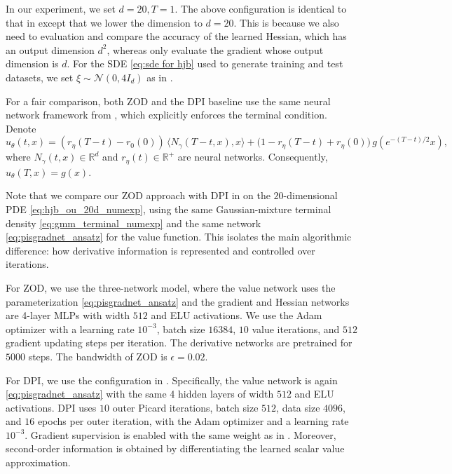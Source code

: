 \documentclass[twoside,11pt]{article}
\newcommand{\R}{\mathbb{R}}
\newcommand{\1}{\mathbf{1}}
\numberwithin{equation}{section}
\begin{document}
In our experiment, we set $
d=20,T=1$. The above configuration is identical to that in \citet{han26} except that we lower the dimension to $d=20$. This is because we  also need to evaluation and compare the accuracy of the learned Hessian, which has an output dimension $d^2$, whereas \citet{han26} only evaluate the gradient whose output dimension is $d$. For the SDE \eqref{eq:sde for hjb} used to generate training and test datasets, we set $ \xi \sim \mathcal{N}(0,4 I_d)$ as in \citet{han26}.





For a fair comparison, both ZOD and the DPI baseline use the same neural network framework from \cite{han26}, which explicitly enforces the terminal condition. Denote
\begin{equation}
    u_\theta(t,x)
    =
    (r_\eta(T - t) - r_0(0))\,\langle N_\gamma(T-t,x),x\rangle
    +
    \bigl(1-r_\eta(T-t) + r_{\eta}(0)\bigr)\,g\!\left(e^{-(T-t)/2}x\right),
    \label{eq:pisgradnet_ansatz}
\end{equation}
where $N_\gamma(t,x)\in\mathbb{R}^d$ and $r_\eta(t) \in \R^+$ are neural networks.
Consequently,
$u_\theta(T,x)=g(x)$.



Note that we compare our ZOD approach with DPI in \cite{han26} on the $20$-dimensional PDE \eqref{eq:hjb_ou_20d_numexp}, using the same Gaussian-mixture terminal density \eqref{eq:gmm_terminal_numexp} and the same network  \eqref{eq:pisgradnet_ansatz} for the value function. This isolates the main algorithmic difference: how derivative information is represented and controlled over iterations.

For ZOD, we use the three-network model,
where the value network uses the parameterization \eqref{eq:pisgradnet_ansatz} and the gradient and Hessian networks are 4-layer MLPs with width $512$ and ELU activations. We use the Adam optimizer with a learning rate $10^{-3}$, batch size $16384$, $10$ value iterations, and $512$ gradient updating steps per iteration. The derivative networks are pretrained for $5000$ steps. The bandwidth of ZOD is $\epsilon=0.02$.

For DPI, we use the configuration in \cite{han26}. Specifically, the value network is again \eqref{eq:pisgradnet_ansatz} with the same 4 hidden layers of width $512$ and ELU activations. DPI uses $10$ outer Picard iterations, batch size $512$, data size $4096$, and $16$ epochs per outer iteration, with the Adam optimizer and a learning rate $10^{-3}$. Gradient supervision is enabled with the same weight as in \cite{han26}. Moreover,  second-order information is obtained by differentiating the learned scalar value approximation.
\end{document}
